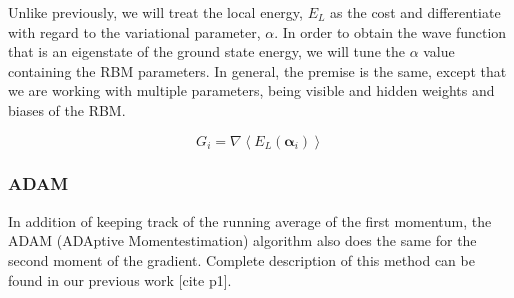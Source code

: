 Unlike previously, we will treat the local energy, $E_L$ as the cost and differentiate with regard to the variational parameter, $\alpha$. In order to obtain the wave function that is an eigenstate of the ground state energy, we will tune the $\alpha$ value containing the RBM parameters. In general, the premise is the same, except that we are working with multiple parameters, being visible and hidden weights and biases of the RBM. 

\begin{equation*}
    G_i = \nabla \left \langle E_L(\mathbf{\alpha}_i) \right \rangle
\end{equation*}

\subsubsection{ADAM}
In addition of keeping track of the running average of the first momentum, the ADAM (ADAptive Momentestimation) algorithm also does the same for the second moment of the gradient. Complete description of this method can be found in our previous work [cite p1]. 

